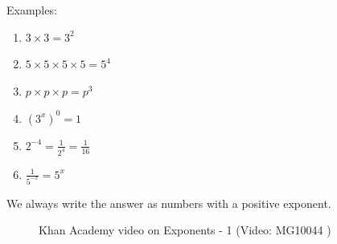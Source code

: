 Examples:
\begin{enumerate}[noitemsep, label=\textbf{\arabic*.}]
\item $3 \times 3 = 3^2$
\item $5 \times 5 \times 5 \times 5 = 5^4 $
\item $p \times p \times p = p^3$
\item $(3^x)^0 = 1$
\item $ 2^{-4} = \frac{1}{2^4} = \frac{1}{16}$
\item $ \frac{1}{5^{-x}} = 5^x$
\end{enumerate}

% 
% 
% 
% 
% 
% 
% 
      
We always write the answer as numbers with a positive exponent.


% 
% 
% 
% 

\setcounter{subfigure}{0}
\begin{figure}[H] %
\textnormal{Khan Academy video on Exponents - 1}\vspace{.1in} 
\label{m38359*yt-media1}\label{m38359*yt-video1}
 { (Video:  MG10044 )}
\end{figure}       


